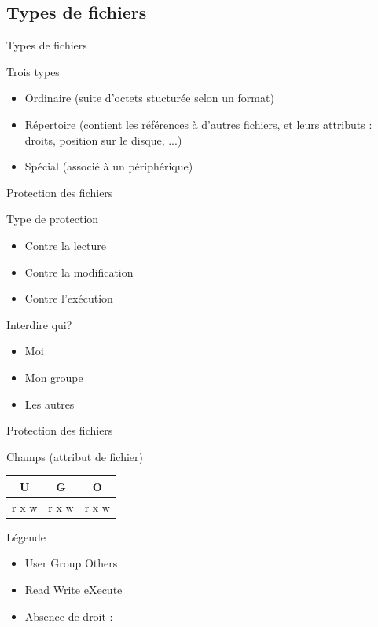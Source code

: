 \subsection{Types de fichiers}
\begin{frame}{Types de fichiers}
\begin{block}{Trois types}
\begin{itemize}
\item Ordinaire (suite d'octets stucturée selon un format)
\item Répertoire (contient les références à d'autres fichiers, et leurs attributs : droits, position sur le disque, ...)
\item Spécial  (associé à un périphérique)
\end{itemize}
\end{block}
\end{frame}

\begin{frame}{Protection des fichiers}
\begin{block}{Type de protection}
\begin{itemize}
\item Contre la lecture
\item Contre la modification
\item Contre l'exécution
\end{itemize}
\end{block}

\begin{block}{Interdire qui?}
\begin{itemize}
\item  Moi
\item  Mon groupe
\item Les autres
\end{itemize}
\end{block}

\end{frame}

\begin{frame}{Protection des fichiers}

\begin{block}{Champs (attribut de fichier)}
\begin{center}
\begin{tabular}{|c|c|c|}
\hline
U & G & O\\
\hline
r x w & r x w & r x w \\
\hline
\end{tabular}
\end{center}
\end{block}

\begin{block}{Légende}
\begin{itemize}
\item  User Group Others
\item  Read Write eXecute
\item  Absence de droit : -
\end{itemize}
\end{block}

\end{frame}


